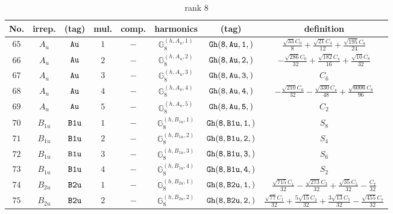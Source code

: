 \documentclass[fleqn,8pt]{jsarticle}
\begin{document}
\begin{table}[ht!]
\begin{center}
\caption{rank 8}
\renewcommand{\arraystretch}{1.3}
\begin{tabular}{cccccccc} \hline \hline
No. & irrep. & (tag) & mul. & comp. & harmonics & (tag) & definition \\ \hline
$ 65 $ & $ A_{u} $ & $ {\tt Au} $ & $ 1 $ & $ - $ & $ \mathbb{G}_{8}^{(h,A_{u},1)} $ & $ {\tt Gh(8,Au,1,)} $ & $ \frac{\sqrt{33} C_{0}}{8} + \frac{\sqrt{21} C_{4}}{12} + \frac{\sqrt{195} C_{8}}{24} $ \\
$ 66 $ & $ A_{u} $ & $ {\tt Au} $ & $ 2 $ & $ - $ & $ \mathbb{G}_{8}^{(h,A_{u},2)} $ & $ {\tt Gh(8,Au,2,)} $ & $ - \frac{\sqrt{286} C_{0}}{32} + \frac{\sqrt{182} C_{4}}{16} + \frac{\sqrt{10} C_{8}}{32} $ \\
$ 67 $ & $ A_{u} $ & $ {\tt Au} $ & $ 3 $ & $ - $ & $ \mathbb{G}_{8}^{(h,A_{u},3)} $ & $ {\tt Gh(8,Au,3,)} $ & $ C_{6} $ \\
$ 68 $ & $ A_{u} $ & $ {\tt Au} $ & $ 4 $ & $ - $ & $ \mathbb{G}_{8}^{(h,A_{u},4)} $ & $ {\tt Gh(8,Au,4,)} $ & $ - \frac{\sqrt{210} C_{0}}{32} - \frac{\sqrt{330} C_{4}}{48} + \frac{\sqrt{6006} C_{8}}{96} $ \\
$ 69 $ & $ A_{u} $ & $ {\tt Au} $ & $ 5 $ & $ - $ & $ \mathbb{G}_{8}^{(h,A_{u},5)} $ & $ {\tt Gh(8,Au,5,)} $ & $ C_{2} $ \\
$ 70 $ & $ B_{1u} $ & $ {\tt B1u} $ & $ 1 $ & $ - $ & $ \mathbb{G}_{8}^{(h,B_{1u},1)} $ & $ {\tt Gh(8,B1u,1,)} $ & $ S_{8} $ \\
$ 71 $ & $ B_{1u} $ & $ {\tt B1u} $ & $ 2 $ & $ - $ & $ \mathbb{G}_{8}^{(h,B_{1u},2)} $ & $ {\tt Gh(8,B1u,2,)} $ & $ S_{4} $ \\
$ 72 $ & $ B_{1u} $ & $ {\tt B1u} $ & $ 3 $ & $ - $ & $ \mathbb{G}_{8}^{(h,B_{1u},3)} $ & $ {\tt Gh(8,B1u,3,)} $ & $ S_{6} $ \\
$ 73 $ & $ B_{1u} $ & $ {\tt B1u} $ & $ 4 $ & $ - $ & $ \mathbb{G}_{8}^{(h,B_{1u},4)} $ & $ {\tt Gh(8,B1u,4,)} $ & $ S_{2} $ \\
$ 74 $ & $ B_{2u} $ & $ {\tt B2u} $ & $ 1 $ & $ - $ & $ \mathbb{G}_{8}^{(h,B_{2u},1)} $ & $ {\tt Gh(8,B2u,1,)} $ & $ \frac{\sqrt{715} C_{1}}{32} - \frac{\sqrt{273} C_{3}}{32} + \frac{\sqrt{35} C_{5}}{32} - \frac{C_{7}}{32} $ \\
$ 75 $ & $ B_{2u} $ & $ {\tt B2u} $ & $ 2 $ & $ - $ & $ \mathbb{G}_{8}^{(h,B_{2u},2)} $ & $ {\tt Gh(8,B2u,2,)} $ & $ \frac{\sqrt{77} C_{1}}{32} + \frac{5 \sqrt{15} C_{3}}{32} + \frac{3 \sqrt{13} C_{5}}{32} - \frac{\sqrt{455} C_{7}}{32} $ \\

\end{tabular}
\end{center}
\end{table}
\end{document}

